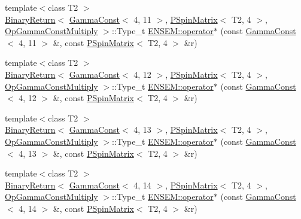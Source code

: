 \begin{DoxyCompactItemize}
\item 
{\footnotesize template$<$class T2 $>$ }\\\mbox{\hyperlink{structENSEM_1_1BinaryReturn}{Binary\+Return}}$<$ \mbox{\hyperlink{classENSEM_1_1GammaConst}{Gamma\+Const}}$<$ 4, 11 $>$, \mbox{\hyperlink{classENSEM_1_1PSpinMatrix}{P\+Spin\+Matrix}}$<$ T2, 4 $>$, \mbox{\hyperlink{structENSEM_1_1OpGammaConstMultiply}{Op\+Gamma\+Const\+Multiply}} $>$\+::Type\+\_\+t \mbox{\hyperlink{group__primspinmatrix_gaa5f831eba31e036c6d9d828c992751ae}{E\+N\+S\+E\+M\+::operator$\ast$}} (const \mbox{\hyperlink{classENSEM_1_1GammaConst}{Gamma\+Const}}$<$ 4, 11 $>$ \&, const \mbox{\hyperlink{classENSEM_1_1PSpinMatrix}{P\+Spin\+Matrix}}$<$ T2, 4 $>$ \&r)
\item 
{\footnotesize template$<$class T2 $>$ }\\\mbox{\hyperlink{structENSEM_1_1BinaryReturn}{Binary\+Return}}$<$ \mbox{\hyperlink{classENSEM_1_1GammaConst}{Gamma\+Const}}$<$ 4, 12 $>$, \mbox{\hyperlink{classENSEM_1_1PSpinMatrix}{P\+Spin\+Matrix}}$<$ T2, 4 $>$, \mbox{\hyperlink{structENSEM_1_1OpGammaConstMultiply}{Op\+Gamma\+Const\+Multiply}} $>$\+::Type\+\_\+t \mbox{\hyperlink{group__primspinmatrix_gac3b96a9e74f7c7170ae4c2713382e011}{E\+N\+S\+E\+M\+::operator$\ast$}} (const \mbox{\hyperlink{classENSEM_1_1GammaConst}{Gamma\+Const}}$<$ 4, 12 $>$ \&, const \mbox{\hyperlink{classENSEM_1_1PSpinMatrix}{P\+Spin\+Matrix}}$<$ T2, 4 $>$ \&r)
\item 
{\footnotesize template$<$class T2 $>$ }\\\mbox{\hyperlink{structENSEM_1_1BinaryReturn}{Binary\+Return}}$<$ \mbox{\hyperlink{classENSEM_1_1GammaConst}{Gamma\+Const}}$<$ 4, 13 $>$, \mbox{\hyperlink{classENSEM_1_1PSpinMatrix}{P\+Spin\+Matrix}}$<$ T2, 4 $>$, \mbox{\hyperlink{structENSEM_1_1OpGammaConstMultiply}{Op\+Gamma\+Const\+Multiply}} $>$\+::Type\+\_\+t \mbox{\hyperlink{group__primspinmatrix_ga704b99c9b5eb26a1b2d439a1106d809b}{E\+N\+S\+E\+M\+::operator$\ast$}} (const \mbox{\hyperlink{classENSEM_1_1GammaConst}{Gamma\+Const}}$<$ 4, 13 $>$ \&, const \mbox{\hyperlink{classENSEM_1_1PSpinMatrix}{P\+Spin\+Matrix}}$<$ T2, 4 $>$ \&r)
\item 
{\footnotesize template$<$class T2 $>$ }\\\mbox{\hyperlink{structENSEM_1_1BinaryReturn}{Binary\+Return}}$<$ \mbox{\hyperlink{classENSEM_1_1GammaConst}{Gamma\+Const}}$<$ 4, 14 $>$, \mbox{\hyperlink{classENSEM_1_1PSpinMatrix}{P\+Spin\+Matrix}}$<$ T2, 4 $>$, \mbox{\hyperlink{structENSEM_1_1OpGammaConstMultiply}{Op\+Gamma\+Const\+Multiply}} $>$\+::Type\+\_\+t \mbox{\hyperlink{group__primspinmatrix_ga8b0118f0d96b78f8fbea926daf66af8f}{E\+N\+S\+E\+M\+::operator$\ast$}} (const \mbox{\hyperlink{classENSEM_1_1GammaConst}{Gamma\+Const}}$<$ 4, 14 $>$ \&, const \mbox{\hyperlink{classENSEM_1_1PSpinMatrix}{P\+Spin\+Matrix}}$<$ T2, 4 $>$ \&r)

\end{DoxyCompactItemize}
